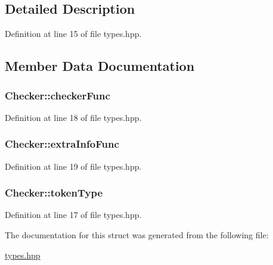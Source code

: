 \subsection{Detailed Description}


Definition at line 15 of file types.\+hpp.



\subsection{Member Data Documentation}
\hypertarget{struct_checker_a5f7c0eb1e12fb66165024172098144d0}{}
\subsubsection[{checker\+Func}]{ Checker\+::checker\+Func}\label{struct_checker_a5f7c0eb1e12fb66165024172098144d0}


Definition at line 18 of file types.\+hpp.

\hypertarget{struct_checker_a4d1a63a813dbc6b1668e8568d04b4cbc}{}
\subsubsection[{extra\+Info\+Func}]{ Checker\+::extra\+Info\+Func}\label{struct_checker_a4d1a63a813dbc6b1668e8568d04b4cbc}


Definition at line 19 of file types.\+hpp.

\hypertarget{struct_checker_a87c6d1c0eaf4ab64bffb9db5b78de6c7}{}
\subsubsection[{token\+Type}]{ Checker\+::token\+Type}\label{struct_checker_a87c6d1c0eaf4ab64bffb9db5b78de6c7}


Definition at line 17 of file types.\+hpp.



The documentation for this struct was generated from the following file\+:\begin{DoxyCompactItemize}
\item 
\hyperlink{types_8hpp}{types.\+hpp}\end{DoxyCompactItemize}
